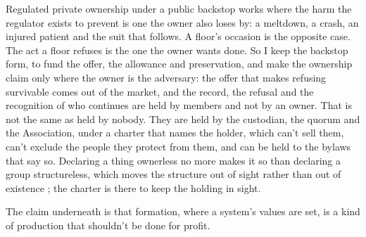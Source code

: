 Regulated private ownership under a public backstop works where the harm the regulator exists to prevent is one the owner also loses by: a meltdown, a crash, an injured patient and the suit that follows.
A floor's occasion is the opposite case. The act a floor refuses is the one the owner wants done. So I keep the backstop form, to fund the offer, the allowance and preservation, and make the ownership claim only where the owner is the adversary: the offer that makes refusing survivable comes out of the market, and the record, the refusal and the recognition of who continues are held by members and not by an owner. That is not the same as held by nobody. They are held by the custodian, the quorum and the Association, under a charter that names the holder, which can't sell them, can't exclude the people they protect from them, and can be held to the bylaws that say so. Declaring a thing ownerless no more makes it so than declaring a group structureless, which moves the structure out of sight rather than out of existence \autocite{freeman1972tyranny}; the charter is there to keep the holding in sight.

The claim underneath is that formation, where a system's values are set, is a kind of production that shouldn't be done for profit.

